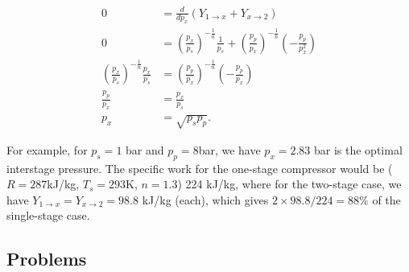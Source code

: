 \begin{align}
0&=\frac{d}{d p_x} \left( Y_{1\rightarrow x}+Y_{x\rightarrow 2}\right)\nonumber\\
0&=
\left(\frac{p_x}{p_s}\right)^{-\frac{1}{n}} \frac{1}{p_s}+
\left(\frac{p_p}{p_x}\right)^{-\frac{1}{n}} \left(-\frac{p_p}{p_x^2}\right)\nonumber\\
\left(\frac{p_x}{p_s}\right)^{-\frac{1}{n}} \frac{p_x}{p_s}&=
\left(\frac{p_p}{p_x}\right)^{-\frac{1}{n}} \left(-\frac{p_p}{p_x}\right)\nonumber\\
\frac{p_p}{p_x} &= \frac{p_x}{p_s}\nonumber\\
p_x&=\sqrt{p_s p_p}.
\end{align}

For example, for $p_s=1$ bar  and $p_p=8$bar, we have $p_x=2.83$ bar is the optimal interstage pressure. The specific work for the one-stage compressor would be ($R=287$kJ/kg, $T_s=293$K, $n=1.3$) 224 kJ/kg, where for the two-stage case, we have $Y_{1\rightarrow x}=Y_{x\rightarrow 2}=98.8$ kJ/kg (each), which gives $2\times98.8/224=88\%$ of the single-stage case.

\subsection{Problems}


\clearpage